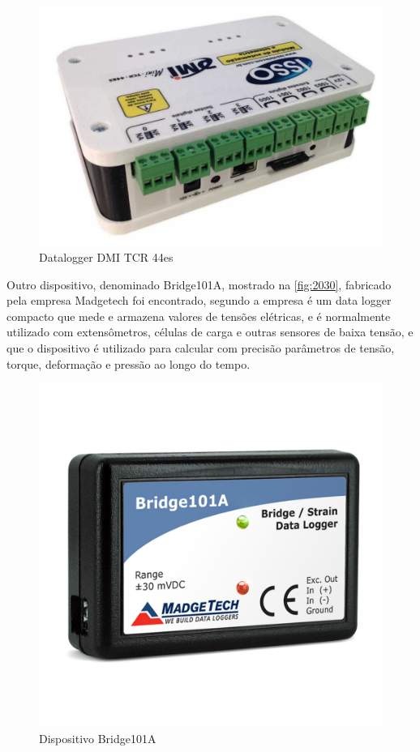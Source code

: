 \begin{figure}[htb]
	\caption{\label{fig:2010} Datalogger DMI TCR 44es}
	\begin{center}
		\includegraphics[width=\textwidth]{pictures/2010.jpg}
	\end{center}
\end{figure}

Outro dispositivo, denominado Bridge101A, mostrado na \autoref{fig:2030}, fabricado pela empresa Madgetech foi encontrado, segundo a empresa é um data logger compacto que mede e armazena valores de tensões elétricas,
e é normalmente utilizado com extensômetros, células de carga e outras sensores de baixa tensão, e que o dispositivo é utilizado para calcular com precisão parâmetros de tensão, torque, deformação
e pressão ao longo do tempo. \autocite{Bridge101A}

\begin{figure}[htb]
	\caption{\label{fig:2030} Dispositivo Bridge101A}
	\begin{center}
		\includegraphics[width=\textwidth]{pictures/2030.jpg}
	\end{center}
\end{figure}

